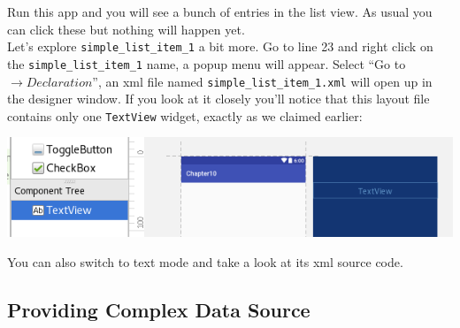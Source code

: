 Run this app and you will see a bunch of entries in the list view. As usual you can click these but nothing will happen yet. \\

Let's explore \texttt{simple\_list\_item\_1} a bit more. Go to line 23 and right click on the \texttt{simple\_list\_item\_1} name, a popup menu will appear. Select ``Go to $\rightarrow Declaration$'', an xml file named \texttt{simple\_list\_item\_1.xml} will open up in the designer window. If you look at it closely you'll notice that this layout file contains only one \texttt{TextView} widget, exactly as we claimed earlier:

\begin{center}
	\includegraphics[scale=0.4]{chapters/ch10/images/10}
\end{center}

You can also switch to text mode and take a look at its xml source code.

\subsection{Providing Complex Data Source}

